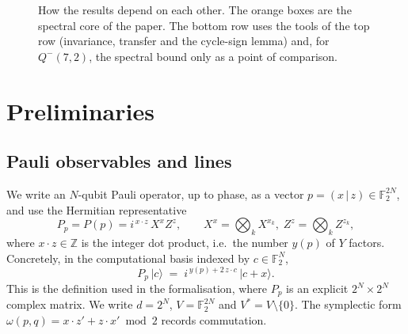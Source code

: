 \documentclass[a4paper,onecolumn,11pt,unpublished,nopdfoutputerror]{quantumarticle}
\theoremstyle{definition}
\newcommand{\F}{\mathbb{F}_2}
\newcommand{\Z}{\mathbb{Z}}
\newcommand{\Qm}[1]{Q^{-}(#1,2)}
\newcommand{\ket}[1]{\lvert #1\rangle}
\newcommand{\Vs}{V^{\ast}}
\begin{document}
\begin{figure}[t]
\caption{How the results depend on each other. The orange boxes are the spectral core of the paper. The bottom
row uses the tools of the top row (invariance, transfer and the cycle-sign lemma) and, for $\Qm7$, the
spectral bound only as a point of comparison.}
\label{fig:roadmap}
\end{figure}

\section{Preliminaries}\label{sec:prelim}

\subsection{Pauli observables and lines}
We write an $N$-qubit Pauli operator, up to phase, as a vector $p=(x\,|\,z)\in\F^{2N}$, and use the
Hermitian representative
\[
  P_p=P(p)=i^{\,x\cdot z}\,X^{x}Z^{z},\qquad X^x=\textstyle\bigotimes_k X^{x_k},\; Z^z=\bigotimes_k Z^{z_k},
\]
where $x\cdot z\in\Z$ is the integer dot product, i.e.\ the number $y(p)$ of $Y$ factors. Concretely, in the
computational basis indexed by $c\in\F^N$,
\begin{equation}\label{eq:paulimatrix}
  P_p\,\ket{c}\;=\;i^{\,y(p)+2\,z\cdot c}\,\ket{c+x}.
\end{equation}
This is the definition used in the formalisation, where $P_p$ is an explicit $2^N\times2^N$ complex matrix.
We write $d=2^N$, $V=\F^{2N}$ and $\Vs=V\setminus\{0\}$. The symplectic form
$\omega(p,q)=x\cdot z'+z\cdot x' \bmod 2$ records commutation.
\end{document}
